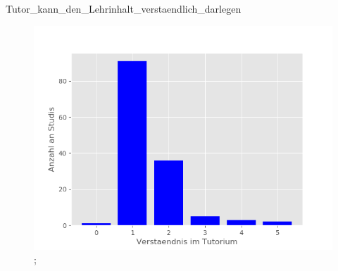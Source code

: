 \documentclass[10pt]{beamer}
\begin{document}
\begin{frame}[fragile]{Tutor_kann_den_Lehrinhalt_verstaendlich_darlegen} 
 \begin{figure}
 \includegraphics[width= 0.9\linewidth]{./PDFcreater/Plots/Tutor_kann_den_Lehrinhalt_verstaendlich_darlegen.png};
 \end{figure}
 \end{frame}
\end{document}
